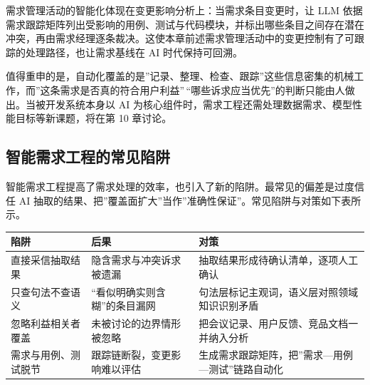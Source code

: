 \documentclass[
]{ctexbook}
\newcounter{none}
\begin{document}
需求管理活动的智能化体现在变更影响分析上：当需求条目变更时，让 LLM
依据需求跟踪矩阵列出受影响的用例、测试与代码模块，并标出哪些条目之间存在潜在冲突，再由需求经理逐条裁决。这使本章前述需求管理活动中的变更控制有了可跟踪的处理路径，也让需求基线在
AI 时代保持可回溯。

值得重申的是，自动化覆盖的是''记录、整理、检查、跟踪''这些信息密集的机械工作，而''这条需求是否真的符合用户利益''\,``哪些诉求应当优先''的判断只能由人做出。当被开发系统本身以
AI 为核心组件时，需求工程还需处理数据需求、模型性能目标等新课题，将在第
10 章讨论。

\subsection{智能需求工程的常见陷阱}\label{ux667aux80fdux9700ux6c42ux5de5ux7a0bux7684ux5e38ux89c1ux9677ux9631}

智能需求工程提高了需求处理的效率，也引入了新的陷阱。最常见的偏差是过度信任
AI
抽取的结果、把''覆盖面扩大''当作''准确性保证''。常见陷阱与对策如下表所示。

{\def\LTcaptype{none} %
\begin{longtable}[]{@{}
  >{\raggedright\arraybackslash}p{}
  >{\raggedright\arraybackslash}p{}
  >{\raggedright\arraybackslash}p{}@{}}
\toprule\noalign{}
\begin{minipage}[b]{\linewidth}\raggedright
陷阱
\end{minipage} & \begin{minipage}[b]{\linewidth}\raggedright
后果
\end{minipage} & \begin{minipage}[b]{\linewidth}\raggedright
对策
\end{minipage} \\
\midrule\noalign{}
\endhead
\bottomrule\noalign{}
\endlastfoot
直接采信抽取结果 & 隐含需求与冲突诉求被遗漏 &
抽取结果形成待确认清单，逐项人工确认 \\
只查句法不查语义 & ``看似明确实则含糊''的条目漏网 &
句法层标记主观词，语义层对照领域知识识别矛盾 \\
忽略利益相关者覆盖 & 未被讨论的边界情形被忽略 &
把会议记录、用户反馈、竞品文档一并纳入分析 \\
需求与用例、测试脱节 & 跟踪链断裂，变更影响难以评估 &
生成需求跟踪矩阵，把''需求---用例---测试''链路自动化 \\
\end{longtable}
}
\end{document}
